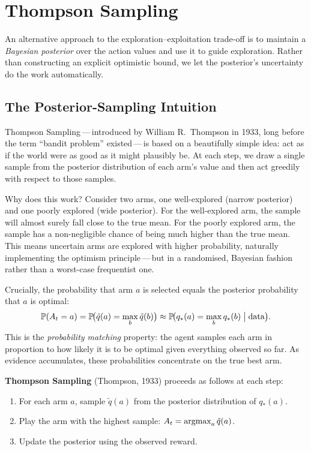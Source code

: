\section{Thompson Sampling}
\label{sec:thompson}

An alternative approach to the exploration--exploitation trade-off is to maintain a \emph{Bayesian posterior} over the action values and use it to guide exploration.  Rather than constructing an explicit optimistic bound, we let the posterior's uncertainty do the work automatically.

\subsection*{The Posterior-Sampling Intuition}

Thompson Sampling\,---\,introduced by William R.\ Thompson in 1933, long before the term ``bandit problem'' existed\,---\,is based on a beautifully simple idea: act as if the world were as good as it might plausibly be.  At each step, we draw a single sample from the posterior distribution of each arm's value and then act greedily with respect to those samples.

Why does this work?  Consider two arms, one well-explored (narrow posterior) and one poorly explored (wide posterior).  For the well-explored arm, the sample will almost surely fall close to the true mean.  For the poorly explored arm, the sample has a non-negligible chance of being much higher than the true mean.  This means uncertain arms are explored with higher probability, naturally implementing the optimism principle\,---\,but in a randomised, Bayesian fashion rather than a worst-case frequentist one.

Crucially, the probability that arm $a$ is selected equals the posterior probability that $a$ is optimal:
\[
\mathbb{P}(A_t = a) = \mathbb{P}\!\bigl(\tilde{q}(a) = \max_{b}\tilde{q}(b)\bigr) \approx \mathbb{P}\!\bigl(q_*(a) = \max_{b}q_*(b)\;\big|\;\text{data}\bigr).
\]
This is the \emph{probability matching} property: the agent samples each arm in proportion to how likely it is to be optimal given everything observed so far.  As evidence accumulates, these probabilities concentrate on the true best arm.

\begin{definition}
\label{def:thompson}
\textbf{Thompson Sampling} (Thompson, 1933) proceeds as follows at each step:
\begin{enumerate}
\item For each arm $a$, sample $\tilde{q}(a)$ from the posterior distribution of $q_*(a)$.
\item Play the arm with the highest sample: $A_t = \operatorname*{argmax}_{a}\tilde{q}(a)$.
\item Update the posterior using the observed reward.
\end{enumerate}
\end{definition}

